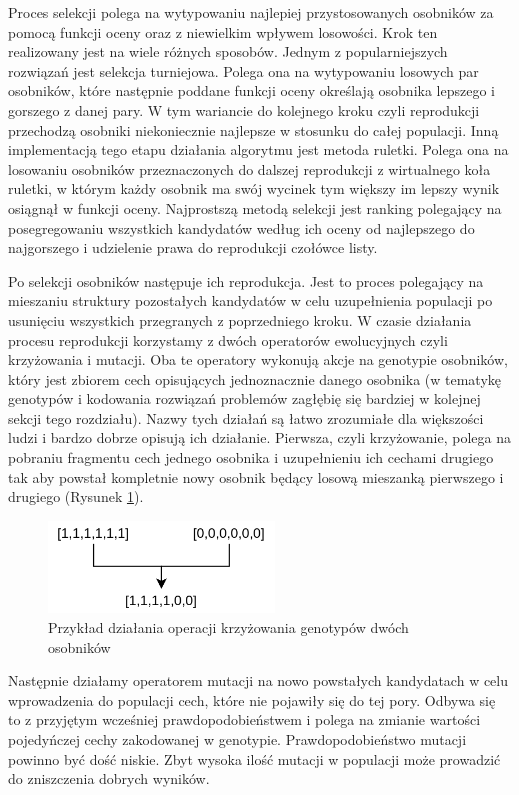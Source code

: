 \documentclass[12pt, oneside, a4paper]{report}
\begin{document}
Proces selekcji polega na wytypowaniu najlepiej przystosowanych osobników za pomocą funkcji oceny oraz z niewielkim wpływem losowości. Krok ten realizowany jest na wiele różnych sposobów. Jednym z popularniejszych rozwiązań jest selekcja turniejowa. Polega ona na wytypowaniu losowych par osobników, które następnie poddane funkcji oceny określają osobnika lepszego i gorszego z danej pary. W tym wariancie do kolejnego kroku czyli reprodukcji przechodzą osobniki niekoniecznie najlepsze w stosunku do całej populacji. Inną implementacją tego etapu działania algorytmu jest metoda ruletki. Polega ona na losowaniu osobników przeznaczonych do dalszej reprodukcji z wirtualnego koła ruletki, w którym każdy osobnik ma swój wycinek tym większy im lepszy wynik osiągnął w funkcji oceny. Najprostszą metodą selekcji jest ranking polegający na posegregowaniu wszystkich kandydatów według ich oceny od najlepszego do najgorszego i udzielenie prawa do reprodukcji czołówce listy.

Po selekcji osobników następuje ich reprodukcja. Jest to proces polegający na mieszaniu struktury pozostałych kandydatów w celu uzupełnienia populacji po usunięciu wszystkich przegranych z poprzedniego kroku. W czasie działania procesu reprodukcji korzystamy z dwóch operatorów ewolucyjnych czyli krzyżowania i mutacji. Oba te operatory wykonują akcje na genotypie osobników, który jest zbiorem cech opisujących jednoznacznie danego osobnika (w tematykę genotypów i kodowania rozwiązań problemów zagłębię się bardziej w kolejnej sekcji tego rozdziału). Nazwy tych działań są łatwo zrozumiałe dla większości ludzi i bardzo dobrze opisują ich działanie. Pierwsza, czyli krzyżowanie, polega na pobraniu fragmentu cech jednego osobnika i uzupełnieniu ich cechami drugiego tak aby powstał kompletnie nowy osobnik będący losową mieszanką pierwszego i drugiego (Rysunek \ref{fig: 3.2}). 

\begin{figure}[h]
	\centering
	\includegraphics[width=6cm]{fig32.png}
	\caption{Przykład działania operacji krzyżowania genotypów dwóch osobników}
	\label{fig: 3.2}
\end{figure}

Następnie działamy operatorem mutacji na nowo powstałych kandydatach w celu wprowadzenia do populacji cech, które nie pojawiły się do tej pory. Odbywa się to z przyjętym wcześniej prawdopodobieństwem i polega na zmianie wartości pojedyńczej cechy zakodowanej w genotypie. Prawdopodobieństwo mutacji powinno być dość niskie. Zbyt wysoka ilość mutacji w populacji może prowadzić do zniszczenia dobrych wyników.
\end{document}
